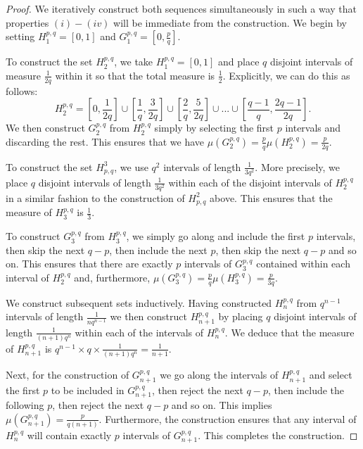 \documentclass[12pt]{article}
\begin{document}
\begin{proof}
We iteratively construct both sequences simultaneously in such a way that properties $(i)-(iv)$ will be immediate from the construction. We begin by setting $H^{p,q}_1=[0,1]$ and $G^{p,q}_1=\left[0,\frac{p}{q}\right]$. 

To construct the set $H_2^{p,q}$, we take $H^{p,q}_1=[0,1]$ and place $q$ disjoint intervals of measure $\frac{1}{2q}$ within it so that the total measure is $\frac{1}{2}$. Explicitly, we can do this as follows:
\[H^{p,q}_2=\left[0,\frac{1}{2q}\right] \cup \left[\frac{1}{q}, \frac{3}{2q}\right] \cup\left[\frac{2}{q}, \frac{5}{2q}\right] \cup ... \cup \left[\frac{q-1}{q},\frac{2q-1}{2q}\right].\]
We then construct $G^{p,q}_2$ from $H^{p,q}_2$ simply by selecting the first $p$ intervals and discarding the rest. This ensures that we have $\mu(G_2^{p,q})=\frac{p}{q}\mu(H_2^{p,q})=\frac{p}{2q}$.

To construct the set $H^3_{p,q}$, we use $q^2$ intervals of length $\frac{1}{3q^2}$. More precisely, we place $q$ disjoint intervals of length $\frac{1}{3q^2}$ within each of the disjoint intervals of $H_2^{p,q}$ in a similar fashion to the construction of $H^2_{p,q}$ above. This ensures that the measure of $H^{p,q}_3$ is $\frac{1}{3}$.

To construct $G^{p,q}_3$ from $H_3^{p,q}$, we simply go along and include the first $p$ intervals, then skip the next $q-p$, then include the next $p$, then skip the next $q-p$ and so on. This ensures that there are exactly $p$ intervals of $G^{p,q}_3$ contained within each interval of $H_2^{p,q}$ and, furthermore, $\mu(G^{p,q}_3)=\frac{p}{q} \mu(H^{p,q}_3)=\frac{p}{3q}$.


We construct subsequent sets inductively.
Having constructed $H_{n}^{p,q}$ from $q^{n-1}$ intervals of length $\frac{1}{nq^{n-1}}$ we then construct $H_{n+1}^{p,q}$ by placing $q$ disjoint intervals of length $\frac{1}{(n+1)q^n}$ within each of the intervals of $H_n^{p,q}$. We deduce that the measure of $H_{n+1}^{p,q}$ is $q^{n-1} \times q \times \frac{1}{(n+1)q^n}= \frac{1}{n+1}$. 

Next, for the construction of $G_{n+1}^{p,q}$ we go along the intervals of $H_{n+1}^{p,q}$ and select the first $p$ to be included in $G_{n+1}^{p,q}$, then reject the next $q-p$, then include the following $p$, then reject the next $q-p$ and so on. This implies $\mu(G_{n+1}^{p,q})=\frac{p}{q(n+1)}$. Furthermore, the construction ensures that any interval of $H_n^{p,q}$ will contain exactly $p$ intervals of $G_{n+1}^{p,q}$. This completes the construction.



\end{proof}
\end{document}
